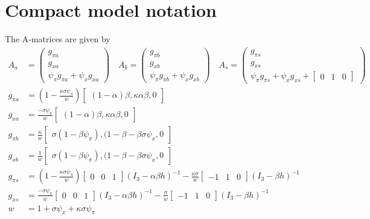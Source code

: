 \documentclass[11pt]{article}
\renewcommand{\[}{\begin{equation}}
\renewcommand{\]}{\end{equation}}
\begin{document}
\section{Compact model notation}\label{app_compact} 
The A-matrices are given by
\begin{align}
A_a & = \begin{pmatrix} g_{\pi a} \\ g_{x a} \\ \psi_{\pi}g_{\pi a} + \psi_xg_{x a}
\end{pmatrix}
\quad A_b = \begin{pmatrix} g_{\pi b} \\ g_{x b} \\ \psi_{\pi}g_{\pi b} + \psi_xg_{x b}
\end{pmatrix}
 \quad A_s = \begin{pmatrix} g_{\pi s} \\ g_{x s} \\ \psi_{\pi}g_{\pi s} + \psi_xg_{x s} + \begin{bmatrix} 0 & 1& 0\end{bmatrix}
\end{pmatrix} \\
g_{\pi a} & =(1-\frac{\kappa\sigma\psi_{\pi}}{w} )  \begin{bmatrix}(1-\alpha)\beta, \kappa\alpha\beta, 0 \end{bmatrix} \\
g_{x a} & =  \frac{-\sigma\psi_{\pi}}{w} \begin{bmatrix}(1-\alpha)\beta, \kappa\alpha\beta, 0 \end{bmatrix}\\
g_{\pi b} & = \frac{\kappa}{w} \begin{bmatrix}\sigma(1-\beta\psi_{\pi}), (1-\beta-\beta\sigma\psi_x, 0 \end{bmatrix}\\
g_{x b} & = \frac{1}{w} \begin{bmatrix}\sigma(1-\beta\psi_{\pi}), (1-\beta-\beta\sigma\psi_x, 0 \end{bmatrix} \\
g_{\pi s} & = (1-\frac{\kappa\sigma\psi_{\pi}}{w} )\begin{bmatrix} 0&0&1 \end{bmatrix} (I_3 - \alpha\beta h)^{-1} -\frac{\kappa\sigma}{w}\begin{bmatrix} -1&1&0 \end{bmatrix} (I_3 -\beta h)^{-1}\\
g_{x s} & =  \frac{-\sigma\psi_{\pi}}{w} \begin{bmatrix} 0&0&1 \end{bmatrix}(I_3 - \alpha\beta h)^{-1}  -\frac{\sigma}{w}\begin{bmatrix} -1&1&0 \end{bmatrix}(I_3 -\beta h)^{-1}\\
w & = 1+\sigma\psi_x +\kappa\sigma\psi_{\pi}
\end{align}
\end{document}
